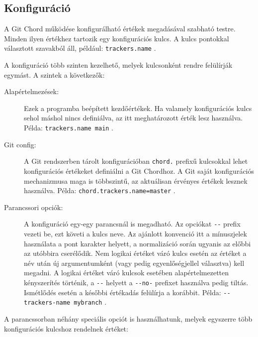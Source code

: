 \documentclass[
]{elteikthesis}[2025/03/25]
\begin{document}
\subsection{Konfiguráció}

A Git Chord működése konfigurálható értékek megadásával szabható testre.
Minden ilyen értékhez tartozik egy konfigurációs kulcs.
A kulcs pontokkal választott szavakból áll, például: \verb|trackers.name| .

A konfiguráció több szinten kezelhető, melyek kulcsonként rendre felülírják egymást.
A szintek a következők:

\begin{description}
    \item[Alapértelmezések:]
        Ezek a programba beépített kezdőértékek.
        Ha valamely konfigurációs kulcs sehol máshol nincs definiálva, az itt meghatározott érték lesz használva.
        Példa: \verb|trackers.name main| .
    \item[Git config:]
        A Git rendszerben tárolt konfigurációban \verb|chord.| prefixű kulcsokkal lehet konfigurációs értékeket definiálni a Git Chordhoz.
        A Git saját konfigurációs mechanizmusa maga is többszintű,
        az aktuálisan érvényes értékek lesznek használva.
        Példa: \verb|chord.trackers.name=master| .
    \item[Parancssori opciók:]
        A konfiguráció egy-egy parancsnál is megadható.
        Az opciókat \verb|--| prefix vezeti be, ezt követi a kulcs neve.
        Az ajánlott konvenció itt a mínuszjelek használata a pont karakter helyett,
        a normalizáció során ugyanis az előbbi az utóbbira cserélődik.
        Nem logikai értéket váró kulcs esetén az értéket a név után új argumentumként (vagy pedig egyenlőségjellel választva) kell megadni.
        A logikai értéket váró kulcsok esetében alapértelmezetten kényszerítés történik,
        a \verb|--| helyett a \verb|--no-| prefixet használva pedig tiltás.
        Ismétlődés esetén a későbbi értékadás felülírja a korábbit.
        Példa: \verb|--trackers-name mybranch| .
\end{description}

A parancssorban néhány speciális opciót is használhatunk, melyek egyszerre több konfigurációs kulcshoz rendelnek értéket:
\end{document}
